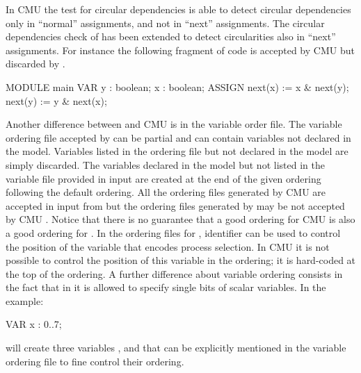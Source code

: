 \begin{itemize}
In CMU \smv the test for circular dependencies is able to detect
circular dependencies only in ``normal'' assignments, and not in
``next'' assignments. The circular dependencies check of \nusmv has
been extended to detect circularities also in ``next''
assignments. For instance the following fragment of code is accepted
by CMU \smv but discarded by \nusmv.

\begin{nusmvCode}
MODULE main
VAR
  y : boolean;
  x : boolean;
ASSIGN
  next(x) := x & next(y);
  next(y) := y & next(x);
\end{nusmvCode}
\end{itemize}

Another difference between \nusmv and CMU \smv is in the variable
order file.  
%
The variable ordering file accepted by \nusmv can be partial and can
contain variables not declared in the model. Variables listed in the
ordering file but not declared in the model are simply discarded. 
%
The variables declared in the model but not listed in the variable
file provided in input are created at the end of the given ordering
following the default ordering. 
%
All the ordering files generated by CMU \smv are accepted in input
from \nusmv but the ordering files generated by \nusmv may be not
accepted by CMU \smv.  
%
Notice that there is no guarantee that a good ordering for CMU \smv is
also a good ordering for \nusmv.  
%
In the ordering files for \nusmv, identifier
 can be used to control the position of
the variable that encodes process selection. 
%
In CMU \smv it is not possible to control the position of this
variable in the ordering; it is hard-coded at the top of the ordering.
%
A further difference about variable ordering consists in the fact that
in \nusmv it is allowed to specify single bits of scalar variables. In
the example:
\begin{nusmvCode}
VAR x : 0..7;
\end{nusmvCode}

\nusmv will create three variables ,  and
 that can be explicitly mentioned in the variable ordering
file to fine control their ordering. 
